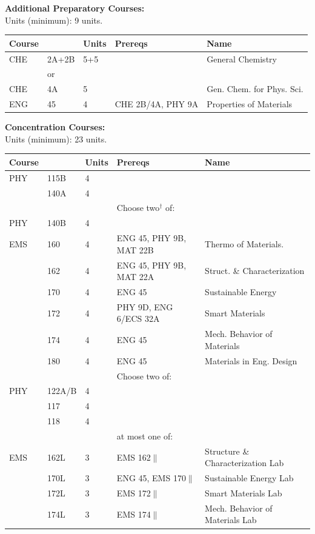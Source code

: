 \documentclass[12pt]{article}
\begin{document}

\newpage
{}
\vskip 0.25cm
\noindent
{\bf Additional Preparatory Courses:  }\\
Units (minimum):  9 units.\\
\begin{tabular}{|lllll|}
\hline
Course & & Units & Prereqs & Name \\
\hline
CHE & 2A+2B     & 5+5 & & General Chemistry\\
    & or        &     & & \\
CHE & 4A        & 5   & & Gen. Chem. for Phys. Sci.\\
\hline
ENG & 45     & 4 & CHE 2B/4A, PHY 9A & Properties of Materials \\
\hline
\end{tabular}
\vskip 0.25cm
\noindent
{\bf Concentration Courses:  }\\
Units (minimum):  23 units.\\
\begin{tabular}{|lllll|}
\hline
Course & & Units & Prereqs & Name \\
\hline
PHY & 115B   & 4 & & \\
    & 140A   & 4 & & \\
\hline
\hline
    & & & Choose two$^\dagger$ of:  & \\
PHY & 140B    & 4 &        & \\
EMS & 160     & 4 & ENG 45, PHY 9B, MAT 22B & Thermo of Materials.  \\
    & 162     & 4 & ENG 45, PHY 9B, MAT 22A & Struct. \& Characterization \\
    & 170     & 4 & ENG 45 & Sustainable Energy \\
    & 172     & 4 & PHY 9D, ENG 6/ECS 32A & Smart Materials \\ 
    & 174     & 4 & ENG 45 & Mech. Behavior of Materials\\
    & 180     & 4 & ENG 45 & Materials in Eng. Design\\
\hline
\hline
    & & & Choose two of: &  \\
PHY & 122A/B & 4 & & \\
    & 117    & 4 & & \\
    & 118    & 4 & & \\
    & & & at most one of: & \\
EMS & 162L   & 3 & EMS 162$\parallel$ & Structure \& Characterization Lab\\
    & 170L   & 3 & ENG 45, EMS 170$\parallel$ & Sustainable Energy Lab \\
    & 172L   & 3 & EMS 172$\parallel$ & Smart Materials Lab \\
    & 174L   & 3 & EMS 174$\parallel$ & Mech. Behavior of Materials Lab \\
\hline
\end{tabular}\\
\end{document}
